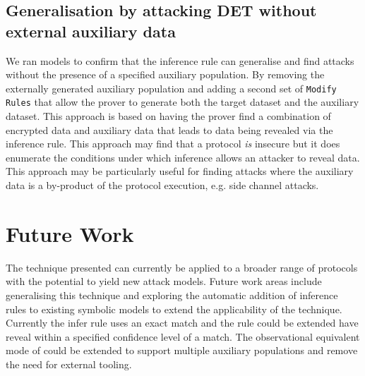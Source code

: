 \documentclass[runningheads]{llncs}
\begin{document}
\subsection{Generalisation by attacking DET without external auxiliary data}
We ran models to confirm that the inference rule can generalise and find attacks without the presence of a specified auxiliary population. By removing the externally generated auxiliary population and adding a second set of \texttt{Modify Rules} that allow the prover to generate both the target dataset and the auxiliary dataset. This approach is based on having the prover find a combination of encrypted data and auxiliary data that leads to data being revealed via the inference rule. This approach may find that a protocol \textit{is} insecure but it does enumerate the conditions under which inference allows an attacker to reveal data. This approach may be particularly useful for finding attacks where the auxiliary data is a by-product of the protocol execution, e.g. side channel attacks.

\section{Future Work}
The technique presented can currently be applied to a broader range of protocols with the potential to yield new attack models. Future work areas include generalising this technique and exploring the automatic addition of inference rules to existing symbolic models to extend the applicability of the technique. Currently the infer rule uses an exact match and the rule could be extended have reveal within a specified confidence level of a match. The observational equivalent mode of \tamarin{} could be extended to support multiple auxiliary populations and remove the need for external tooling. 




\end{document}
